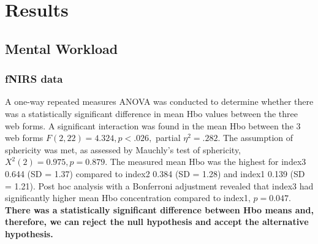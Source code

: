 \documentclass[../main/Feedback.tex]{subfiles}
\begin{document}
\section{Results}
		\subsection{Mental Workload}
		\subsubsection{fNIRS data}
		A one-way repeated measures ANOVA was conducted to determine whether there was a statistically significant difference in mean Hbo values between the three web forms. A significant interaction was found in the mean Hbo between the 3 web forms $F(2,22)=4.324, p<.026,$ partial $\eta^{2}=.282$. The assumption of sphericity was met, as assessed by Mauchly's test of sphericity, $X^{2}(2) = 0.975, p = 0.879$. The measured mean Hbo was the highest for index3 0.644 (SD = 1.37) compared to index2 0.384 (SD = 1.28) and index1 0.139 (SD = 1.21). Post hoc analysis with a Bonferroni adjustment revealed that index3 had significantly higher mean Hbo concentration compared to index1, $p=0.047$. \textbf{There was a statistically significant difference between Hbo means and, therefore, we can reject the null hypothesis and accept the alternative hypothesis.}
		
		
\end{document}
